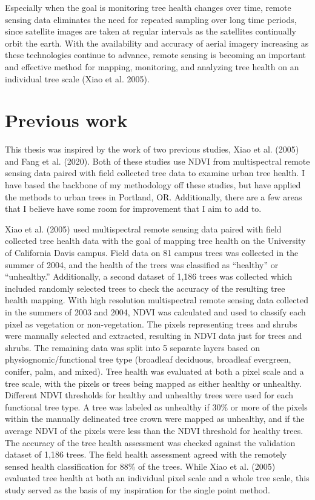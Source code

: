 \documentclass[12pt,twoside]{reedthesis}
\begin{document}
Especially when the goal is monitoring tree health changes over time,
remote sensing data eliminates the need for repeated sampling over long
time periods, since satellite images are taken at regular intervals as
the satellites continually orbit the earth. With the availability and
accuracy of aerial imagery increasing as these technologies continue to
advance, remote sensing is becoming an important and effective method
for mapping, monitoring, and analyzing tree health on an individual tree
scale (Xiao et al. 2005).

\hypertarget{previous-work}{%
\section{Previous work}\label{previous-work}}

This thesis was inspired by the work of two previous studies, Xiao et al. (2005)
and Fang et al. (2020). Both of these studies use NDVI from multispectral remote
sensing data paired with field collected tree data to examine urban tree
health. I have based the backbone of my methodology off these studies,
but have applied the methods to urban trees in Portland, OR.
Additionally, there are a few areas that I believe have some room for
improvement that I aim to add to.

Xiao et al. (2005) used multispectral remote sensing data paired with field
collected tree health data with the goal of mapping tree health on the
University of California Davis campus. Field data on 81 campus trees was
collected in the summer of 2004, and the health of the trees was
classified as ``healthy'' or ``unhealthy.'' Additionally, a second dataset
of 1,186 trees was collected which included randomly selected trees to
check the accuracy of the resulting tree health mapping. With high
resolution multispectral remote sensing data collected in the summers of
2003 and 2004, NDVI was calculated and used to classify each pixel as
vegetation or non-vegetation. The pixels representing trees and shrubs
were manually selected and extracted, resulting in NDVI data just for
trees and shrubs. The remaining data was split into 5 separate layers
based on physiognomic/functional tree type (broadleaf deciduous,
broadleaf evergreen, conifer, palm, and mixed). Tree health was
evaluated at both a pixel scale and a tree scale, with the pixels or
trees being mapped as either healthy or unhealthy. Different NDVI
thresholds for healthy and unhealthy trees were used for each functional
tree type. A tree was labeled as unhealthy if 30\% or more of the pixels
within the manually delineated tree crown were mapped as unhealthy, and
if the average NDVI of the pixels were less than the NDVI threshold for
healthy trees. The accuracy of the tree health assessment was checked
against the validation dataset of 1,186 trees. The field health
assessment agreed with the remotely sensed health classification for 88\%
of the trees. While Xiao et al. (2005) evaluated tree health at both an
individual pixel scale and a whole tree scale, this study served as the
basis of my inspiration for the single point method.
\end{document}
